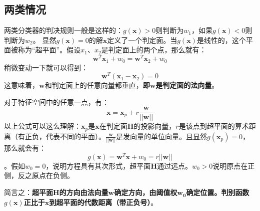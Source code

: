 \documentclass[12pt, letterpaper]{article}
\begin{document}
\subsection{两类情况}
两类分类器的判决规则一般是这样的：$g(\mathbf{x})>0$则判断为$w_1$，如果$g(\mathbf{x})<0$则判断为$w_2$。
显然$g(\mathbf{x})=0$的解$\mathbf{x}$定义了一个判定面。当$g(\mathbf{x})$是线性的，这个平面被称为“超平面”。假设$x_1$、$x_2$是判定面上的两个点，那么就有：
$$\mathbf{w}^T\mathbf{x}_1+w_0=\mathbf{w}^T\mathbf{x}_2+w_0$$
稍微变动一下就可以得到：
\begin{equation}
\mathbf{w}^T(\mathbf{x}_1-\mathbf{x}_2)=0
\end{equation}
这意味着，$\mathbf{w}$和判定面上的任意向量都垂直，\textbf{即}$\mathbf{w}$\textbf{是判定面的法向量}。

对于特征空间中的任意一点，有：
\begin{equation}
\mathbf{x}=\mathbf{x}_p+r\frac{\mathbf{w}}{||\mathbf{w}||}
\end{equation}
以上公式可以这么理解：$\mathbf{x}_p$是$\mathbf{x}$在判定面$\mathbf{H}$的投影向量，$r$是该点到超平面的算术距离（有正负，代表不同的平面）。$\frac{\mathbf{w}}{||\mathbf{w}||}$是发向量的单位向量。且显然$g(\mathbf{x}_p)=0$，那么就会有：
$$g(\mathbf{x})=\mathbf{w}^T\mathbf{x}+w_0=r||\mathbf{w}||$$。假如$w_0=0$，说明方程具有其次形式，超平面$\mathbf{H}$通过远点。$w_0>0$说明原点在正侧，反之原点在负侧。

简言之：\textbf{超平面$\mathbf{H}$的方向由法向量$\mathbf{w}$确定方向，由阈值权$\mathbf{w_0}$确定位置。判别函数$g(\mathbf{x})$正比于$\mathbf{x}$到超平面的代数距离（带正负号）}。
\end{document}
